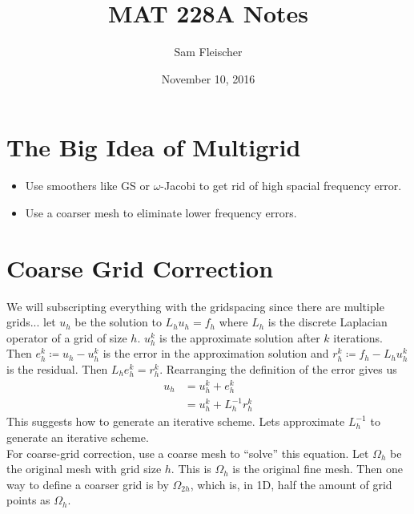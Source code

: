 \documentclass{article}
\title{MAT 228A Notes}
\author{Sam Fleischer}
\date{November 10, 2016}
\begin{document}
    \maketitle

    \section{The Big Idea of Multigrid}
        \begin{itemize}
            \item Use smoothers like GS or $\omega$-Jacobi to get rid of high spacial frequency error.
            \item Use a coarser mesh to eliminate lower frequency errors.
        \end{itemize}

    \section{Coarse Grid Correction}
        We will subscripting everything with the gridspacing since there are multiple grids... let $u_h$ be the solution to $L_hu_h = f_h$ where $L_h$ is the discrete Laplacian operator of a grid of size $h$.  $u_h^k$ is the approximate solution after $k$ iterations.  Then $e_h^k \coloneqq u_h - u_h^k$ is the error in the approximation solution and $r_h^k \coloneqq f_h - L_hu_h^k$ is the residual.  Then $L_he_h^k = r_h^k$.  Rearranging the definition of the error gives us
        \begin{align*}
            u_h &= u_h^k + e_h^k \\
            &= u_h^k + L_h^{-1}r_h^k
        \end{align*}
        This suggests how to generate an iterative scheme.  Lets approximate $L_h^{-1}$ to generate an iterative scheme. \\

        For coarse-grid correction, use a coarse mesh to ``solve'' this equation.  Let $\Omega_h$ be the original mesh with grid size $h$.  This is $\Omega_h$ is the original fine mesh.  Then one way to define a coarser grid is by $\Omega_{2h}$, which is, in 1D, half the amount of grid points as $\Omega_h$.
\end{document}
